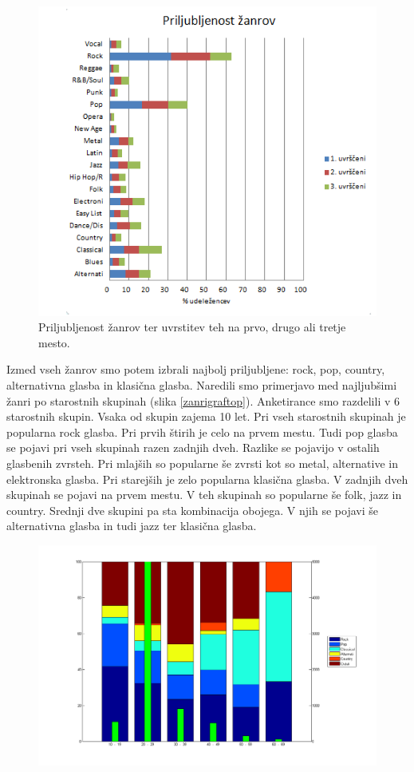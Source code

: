 \documentclass[a4paper, 12pt]{book}
\begin{document}
{\begin{figure}[hbt]
\centering
\includegraphics[width=13cm]{images/genre.png}

\caption{Priljubljenost žanrov ter uvrstitev teh na prvo, drugo ali tretje mesto.  }
\label{zanrigraf}
\end{figure}

Izmed vseh žanrov smo potem izbrali najbolj priljubljene: rock, pop, country, alternativna glasba in klasična glasba. Naredili smo primerjavo med najljubšimi žanri po starostnih skupinah (slika \ref{zanrigraftop}). Anketirance smo razdelili v 6 starostnih skupin. Vsaka od skupin zajema 10 let. Pri vseh starostnih skupinah je popularna rock glasba. Pri prvih štirih je celo na prvem mestu. Tudi pop glasba se pojavi pri vseh skupinah razen zadnjih dveh. Razlike se pojavijo v ostalih glasbenih zvrsteh. Pri mlajših so popularne še zvrsti kot so metal, alternative in elektronska glasba. Pri starejših je zelo popularna klasična glasba. V zadnjih dveh skupinah se pojavi na prvem mestu. V teh skupinah so popularne še folk, jazz in country. Srednji dve skupini pa sta kombinacija obojega. V njih se pojavi še alternativna glasba in tudi jazz ter klasična glasba. 

\begin{figure}[hbt]
\centering
\includegraphics[width=15cm]{images/genretop1.png}


\end{figure}}
\end{document}
